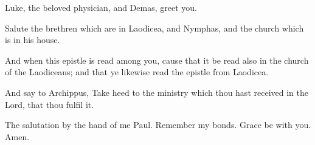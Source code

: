 \verse Luke, the beloved physician, and Demas, greet you.

\verse Salute the brethren which are in Laodicea, and Nymphas, and the church which is in his house.

\verse And when this epistle is read among you, cause that it be read also in the church of the Laodiceans; and that ye likewise read the epistle from Laodicea.

\verse And say to Archippus, Take heed to the ministry which thou hast received in the Lord, that thou fulfil it.

\verse The salutation by the hand of me Paul. Remember my bonds. Grace be with you. Amen.

